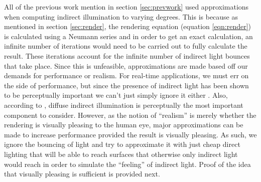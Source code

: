 All of the previous work mention in section \ref{sec:prevwork} used approximations when computing indirect illumination to varying degrees.  This is because as mentioned in section \ref{sec:render}, the rendering equation (equation \ref{eqn:render}) is calculated using a Neumann series and in order to get an exact calculation, an infinite number of iterations would need to be carried out to fully calculate the result.  These iterations account for the infinite number of indirect light bounces that take place.  Since this is unfeasible, approximations are made based off our demands for performance or realism.  For real-time applications, we must err on the side of performance, but since the presence of indirect light has been shown to be perceptually important we can't just simply ignore it either \cite{Stokes2004}.  Also, according to \cite{Stokes2004}, diffuse indirect illumination is perceptually the most important component to consider.  However, as the notion of “realism” is merely whether the rendering is visually pleasing to the human eye, major approximations can be made to increase performance provided the result is visually pleasing.  As such, we ignore the bouncing of light and try to approximate it with just cheap direct lighting that will be able to reach surfaces that otherwise only indirect light would reach in order to simulate the “feeling” of indirect light.  Proof of the idea that visually pleasing is sufficient is provided next.

